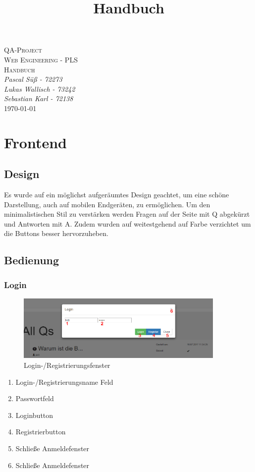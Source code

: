 \documentclass[a4paper]{report}
\begin{document}
\begin{titlepage}
	\centering
	{\scshape\Huge QA-Project}
	\vspace{1cm} \\
	{\scshape\LARGE Web Engineering - PLS}
	\vspace{1cm} \\
	{\scshape\LARGE Handbuch}
	\vspace{1cm} \\
	{\large\itshape Pascal Süß - 72273} \\
	\vspace{0.5cm}
	{\large\itshape Lukas Wallisch - 73242} \\ 
	\vspace{0.5cm}
	{\large\itshape Sebastian Karl - 72138} \\ 
	\vfill
	{\large \today}
\end{titlepage}
\title{Handbuch}

\tableofcontents

\part{Frontend}
\chapter{Design}
Es wurde auf ein möglichst aufgeräumtes Design geachtet, um eine schöne Darstellung, auch auf mobilen Endgeräten, zu ermöglichen. Um den minimalistischen Stil zu verstärken werden Fragen auf der Seite mit Q abgekürzt und Antworten mit A. Zudem wurden auf weitestgehend auf Farbe verzichtet um die Buttons besser hervorzuheben.
\chapter{Bedienung}
\section{Login}
\begin{figure}[h!]
	\centering
	\includegraphics[width=0.9\textwidth]{./Bilder/Login.PNG}
	\caption{Login-/Registrierungsfenster}
	\label{fig:Loginfenster}
\end{figure}
\centering\begin{enumerate}
	\item Login-/Registrierungsname Feld
	\item Passwortfeld
	\item Loginbutton
	\item Registrierbutton
	\item Schließe Anmeldefenster
	\item Schließe Anmeldefenster
\end{enumerate}
\newpage
\end{document}
